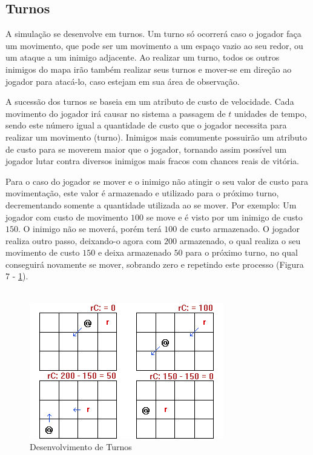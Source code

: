 \subsection{Turnos}
A simulação se desenvolve em turnos. Um turno só ocorrerá caso o jogador faça um movimento, que pode ser um movimento a um espaço vazio ao seu redor, ou um ataque a um inimigo adjacente. Ao realizar um turno, todos os outros inimigos do mapa irão também realizar seus turnos e mover-se em direção ao jogador para atacá-lo, caso estejam em sua área de observação. 

A sucessão dos turnos se baseia em um atributo de custo de velocidade. Cada movimento do jogador irá causar no sistema a passagem de $t$ unidades de tempo, sendo este número igual a quantidade de custo que o jogador necessita para realizar um movimento (turno). Inimigos mais comumente possuirão um atributo de custo para se moverem maior que o jogador, tornando assim possível um jogador lutar contra diversos inimigos mais fracos com chances reais de vitória.

Para o caso do jogador se mover e o inimigo não atingir o seu valor de custo para movimentação, este valor é armazenado e utilizado para o próximo turno, decrementando somente a quantidade utilizada ao se mover. Por exemplo: Um jogador com custo de movimento $100$ se move e é visto por um inimigo de custo $150$. O inimigo não se moverá, porém terá $100$ de custo armazenado. O jogador realiza outro passo, deixando-o agora com $200$ armazenado, o qual realiza o seu movimento de custo $150$ e deixa armazenado $50$ para o próximo turno, no qual conseguirá novamente se mover, sobrando zero e repetindo este processo (Figura 7 - \ref{fig07}).
\\\\
\begin{figure}[h]
	\centering
	\label{fig07}
		\includegraphics[keepaspectratio=true,scale=0.8]{figuras/fig07-turn.png}
	\caption{Desenvolvimento de Turnos}
\end{figure}

